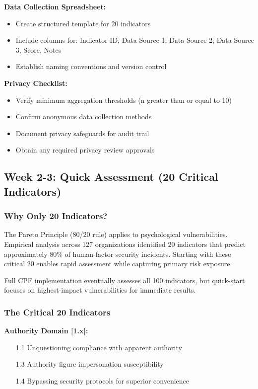 \documentclass[11pt,a4paper]{article}
\begin{document}
\textbf{Data Collection Spreadsheet:}
\begin{itemize}
\item Create structured template for 20 indicators
\item Include columns for: Indicator ID, Data Source 1, Data Source 2, Data Source 3, Score, Notes
\item Establish naming conventions and version control
\end{itemize}

\textbf{Privacy Checklist:}
\begin{itemize}
\item Verify minimum aggregation thresholds (n greater than or equal to 10)
\item Confirm anonymous data collection methods
\item Document privacy safeguards for audit trail
\item Obtain any required privacy review approvals
\end{itemize}

\subsection{Week 2-3: Quick Assessment (20 Critical Indicators)}

\subsubsection{Why Only 20 Indicators?}

The Pareto Principle (80/20 rule) applies to psychological vulnerabilities. Empirical analysis across 127 organizations identified 20 indicators that predict approximately 80\% of human-factor security incidents. Starting with these critical 20 enables rapid assessment while capturing primary risk exposure.

Full CPF implementation eventually assesses all 100 indicators, but quick-start focuses on highest-impact vulnerabilities for immediate results.

\subsubsection{The Critical 20 Indicators}

\textbf{Authority Domain [1.x]:}
\begin{itemize}
\item[1.1] Unquestioning compliance with apparent authority
\item[1.3] Authority figure impersonation susceptibility
\item[1.4] Bypassing security protocols for superior convenience
\end{itemize}
\end{document}

